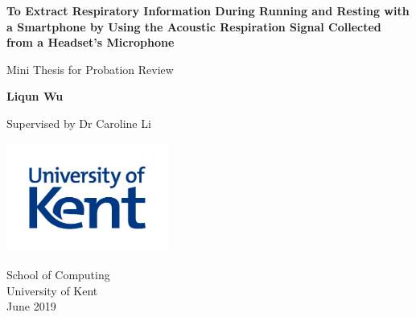 \documentclass{report}
\begin{document}
\begin{titlepage}
    \begin{center}
 
        \Huge
        \textbf{To Extract Respiratory Information During Running and Resting with a Smartphone by Using the Acoustic Respiration Signal Collected from a Headset’s Microphone}
 
        \LARGE
        Mini Thesis for Probation Review
 
        \vspace{0.5cm}

        \textbf{Liqun Wu}

        \Large
        Supervised by Dr Caroline Li
 
        \vfill
 
        \vspace{0.8cm}
 
        \includegraphics[width=0.4\textwidth]{figures/logo.jpg}
 
        \Large
        School of Computing\\
        University of Kent\\
        June 2019
 
    \end{center}
\end{titlepage}

\tableofcontents
\listoffigures







\printbibliography
\end{document}
